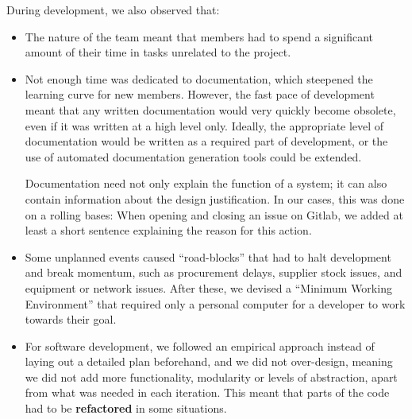\documentclass[]{iac}
\def\todo#1{}
\begin{document}
During development, we also observed that:
\todo{Should I just combine the lessons learned from each mission into a single section?}
\begin{itemize}[itemsep=0pt]
    \item The nature of the team meant that members had to spend a significant amount of their time in tasks unrelated to the project.
    \item Not enough time was dedicated to documentation, which steepened the learning curve for new members. However, the fast pace of development meant that any written documentation would very quickly become obsolete, even if it was written at a high level only. Ideally, the appropriate level of documentation would be written as a required part of development, or the use of automated documentation generation tools could be extended.

    Documentation need not only explain the function of a system; it can also contain information about the design justification. In our cases, this was done on a rolling bases: When opening and closing an issue on Gitlab, we added at least a short sentence explaining the reason for this action. %
    \item Some unplanned events caused ``road-blocks'' that had to halt development and break momentum, such as procurement delays, supplier stock issues, and equipment or network issues. After these, we devised a ``Minimum Working Environment'' that required only a personal computer for a developer to work towards their goal.
    \item For software development, we followed an empirical approach instead of laying out a detailed plan beforehand, and we did not over-design, meaning we did not add more functionality, modularity or levels of abstraction, apart from what was needed in each iteration. This meant that parts of the code had to be \textbf{refactored} in some situations. %


\end{itemize}
\end{document}
